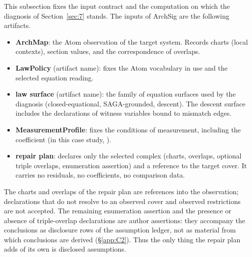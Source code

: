This subsection fixes the input contract and the computation on
which the diagnosis of Section~\ref{sec:7} stands. The inputs of ArchSig are the following
artifacts.
\begin{itemize}
\item \textbf{ArchMap}: the Atom observation of the target system.
Records charts (local contexts), section values, and the
correspondence of overlaps.
\item \textbf{LawPolicy} (artifact name): fixes the Atom vocabulary in
use and the selected equation reading.
\item \textbf{law surface} (artifact name): the family of equation
surfaces used by the diagnosis (closed-equational, SAGA-grounded,
descent). The descent surface includes the declarations of witness
variables bound to mismatch edges.
\item \textbf{MeasurementProfile}: fixes the conditions of
measurement, including the coefficient (in this case study,
).
\item \textbf{repair plan}: declares only the selected complex
(charts, overlaps, optional triple overlaps, enumeration assertion)
and a reference to the target cover. It carries no residuals, no
coefficients, no comparison data.
\end{itemize}

The charts and overlaps of the repair plan are references into the
observation; declarations that do not resolve to an observed cover and
observed restrictions are not accepted. The remaining enumeration
assertion and the presence or absence of triple-overlap declarations
are author assertions: they accompany the conclusions as disclosure
rows of the assumption ledger, not as material from which conclusions
are derived (\S\ref{app:C2}). Thus the only thing the repair plan adds
of its own is disclosed assumptions.


